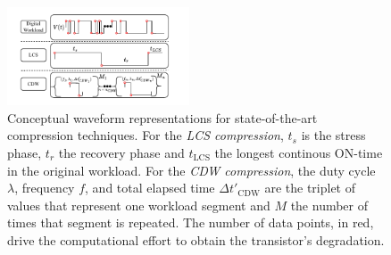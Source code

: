 \begin{figure}[!b]
    \includegraphics[width=0.48\textwidth,trim={7mm 3.5mm 10.5mm 3mm},clip]{images/ch2/WaveformRepresentationsSect2.pdf}
    \caption{Conceptual waveform representations for state-of-the-art compression techniques. For the \textit{LCS compression}, $t_s$ is the stress phase, $t_r$ the recovery phase and $t_{\text{LCS}}$ the longest continous ON-time in the original workload. For the \textit{CDW compression}, the duty cycle $\lambda$, frequency $f$, and total elapsed time $\Delta t'_{\text{CDW}}$ are the triplet of values that represent one workload segment and $M$ the number of times that segment is repeated. The number of data points, in red, drive the computational effort to obtain the transistor's degradation.}
    \label{fig:sect2waveformRepresentations}
\end{figure}

